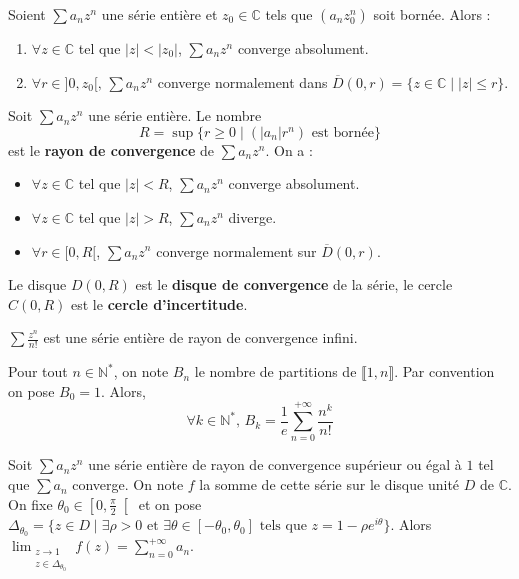   \begin{lemma}[Abel]
    Soient $\sum a_n z^n$ une série entière et $z_0 \in \mathbb{C}$ tels que $(a_n z_0^n)$ soit bornée. Alors :
    \begin{enumerate}[label=(\roman*)]
      \item $\forall z \in \mathbb{C}$ tel que $|z| < |z_0|$, $\sum a_n z^n$ converge absolument.
      \item $\forall r \in ]0,z_0[, \, \sum a_n z^n$ converge normalement dans $\overline{D}(0, r) = \{ z \in \mathbb{C} \mid |z| \leq r \}$.
    \end{enumerate}
  \end{lemma}

  \begin{definition}
    Soit $\sum a_n z^n$ une série entière. Le nombre
    \[ R = \sup \{ r \geq 0 \mid (|a_n|r^n) \text{ est bornée} \} \]
    est le \textbf{rayon de convergence} de $\sum a_n z^n$. On a :
    \begin{itemize}
      \item $\forall z \in \mathbb{C}$ tel que $|z| < R$, $\sum a_n z^n$ converge absolument.
      \item $\forall z \in \mathbb{C}$ tel que $|z| > R$, $\sum a_n z^n$ diverge.
      \item $\forall r \in [0,R[$, $\sum a_n z^n$ converge normalement sur $\overline{D}(0,r)$.
    \end{itemize}
    Le disque $D(0,R)$ est le \textbf{disque de convergence} de la série, le cercle $C(0,R)$ est le \textbf{cercle d'incertitude}.
  \end{definition}

  \begin{example}
    $\sum \frac{z^n}{n!}$ est une série entière de rayon de convergence infini.
  \end{example}


  \begin{theorem}
    Pour tout $n \in \mathbb{N}^*$, on note $B_n$ le nombre de partitions de $\llbracket 1, n \rrbracket$. Par convention on pose $B_0 = 1$. Alors,
    \[ \forall k \in \mathbb{N}^*, \, B_k = \frac{1}{e} \sum_{n=0}^{+\infty} \frac{n^k}{n!} \]
  \end{theorem}


  \begin{theorem}
    \label{230-1}
    Soit $\sum a_n z^n$ une série entière de rayon de convergence supérieur ou égal à $1$ tel que $\sum a_n$ converge. On note $f$ la somme de cette série sur le disque unité $D$ de $\mathbb{C}$. On fixe $\theta_0 \in \left[ 0, \frac{\pi}{2} \right[$ et on pose $\Delta_{\theta_0} = \{ z \in D \mid \exists \rho > 0 \text{ et } \exists \theta \in [-\theta_0, \theta_0] \text{ tels que } z = 1 - \rho e^{i\theta} \}$.
    \newpar
    Alors $\lim_{\substack{z \rightarrow 1 \\ z \in \Delta_{\theta_0}}} f(z) = \sum_{n=0}^{+\infty} a_n$.
  \end{theorem}

